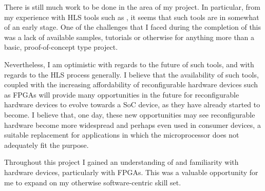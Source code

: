 There is still much work to be done in the area of my \thesis{} project. In
particular, from my experience with \gls{HLS} tools such as \AutoESL{}, it seems
that such tools are in somewhat of an early stage. One of the challenges that I
faced during the completion of this \thesis{} was a lack of available samples,
tutorials or otherwise for anything more than a basic, proof-of-concept type
\AutoESL{} project.

Nevertheless, I am optimistic with regards to the future of such tools, and with
regards to the \gls{HLS} process generally. I believe that the availability of
such tools, coupled with the increasing affordability of reconfigurable hardware
devices such as \glspl{FPGA} will provide many opportunities in the future for
reconfigurable hardware devices to evolve towards a \gls{SoC} device, as they
have already started to become. I believe that, one day, these new opportunities
may see reconfigurable hardware become more widespread and perhaps even used in
consumer devices, a suitable replacement for applications in which the
microprocessor does not adequately fit the purpose.

Throughout this project I gained an understanding of and familiarity with
hardware devices, particularly with \glspl{FPGA}. This was a valuable
opportunity for me to expand on my otherwise software-centric skill set.